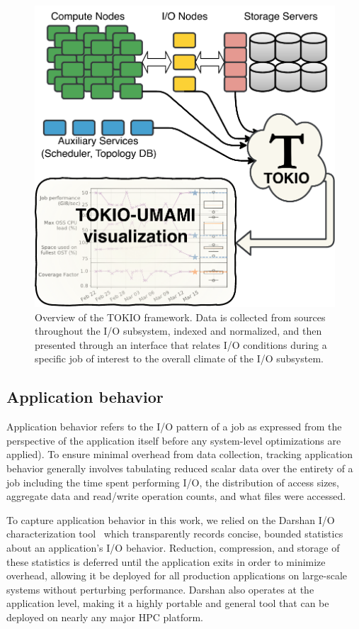 \begin{figure}[t]
    \centering
    \includegraphics[width=\columnwidth]{figs/tokio-schematic.pdf}
    \caption{Overview of the TOKIO framework.  Data is collected from sources throughout the I/O subsystem, indexed and normalized, and then presented through an interface that relates I/O conditions during a specific job of interest to the overall climate of the I/O subsystem.}
    \label{fig:tokio-schematic}
\end{figure}

\subsection{Application behavior} \label{sec:methods/darshan}

Application behavior refers to the I/O pattern of a job as expressed from the perspective of the application itself before any system-level optimizations are applied).  To ensure minimal overhead from data collection, tracking application behavior generally involves tabulating reduced scalar data over the entirety of a job including the time spent performing I/O, the distribution of access sizes, aggregate data and read/write operation counts, and what files were accessed.

To capture application behavior in this work, we relied on the Darshan I/O characterization tool~\cite{carns200924} which transparently records concise, bounded statistics about an application's I/O behavior.
Reduction, compression, and storage of these statistics is deferred until the application exits in order to minimize overhead, allowing it be deployed for all production applications on large-scale systems without perturbing performance.
Darshan also operates at the application level, making it a highly portable and general tool that can be deployed on nearly any major HPC platform.

